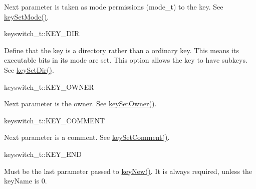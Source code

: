 \begin{DoxyItemize}
 Next parameter is taken as mode permissions (mode\-\_\-t) to the key. See \hyperlink{group__keymeta_ga8803037e35b9da1ce492323a88ff6bc3}{key\-Set\-Mode()}.
\item keyswitch\-\_\-t\-::\-K\-E\-Y\-\_\-\-D\-I\-R \par
 Define that the key is a directory rather than a ordinary key. This means its executable bits in its mode are set. This option allows the key to have subkeys. See \hyperlink{group__keymeta_gaae575bd86a628a15ee45baa860522e75}{key\-Set\-Dir()}.
\item keyswitch\-\_\-t\-::\-K\-E\-Y\-\_\-\-O\-W\-N\-E\-R \par
 Next parameter is the owner. See \hyperlink{group__keyname_ga88d6ec200ba0707b7c1b4a88133d2be4}{key\-Set\-Owner()}.
\item keyswitch\-\_\-t\-::\-K\-E\-Y\-\_\-\-C\-O\-M\-M\-E\-N\-T \par
 Next parameter is a comment. See \hyperlink{group__keyvalue_ga8863a877a84fa46e6017fe72e49b89c1}{key\-Set\-Comment()}.
\item keyswitch\-\_\-t\-::\-K\-E\-Y\-\_\-\-E\-N\-D \par
 Must be the last parameter passed to \hyperlink{group__key_gaf6893c038b3ebee90c73a9ea8356bebf}{key\-New()}. It is always required, unless the {\ttfamily key\-Name} is 0.
\end{DoxyItemize}

